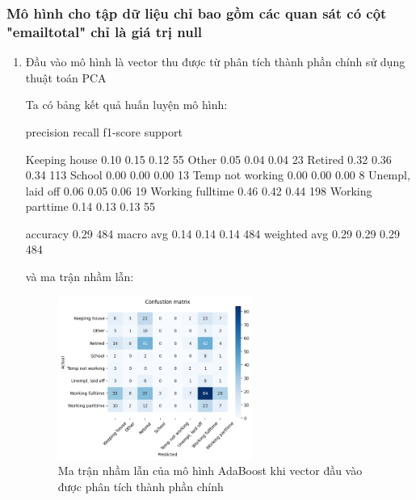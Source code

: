 \subsubsection{Mô hình cho tập dữ liệu chỉ bao gồm các quan sát có cột "emailtotal" chỉ là giá trị null}

\begin{enumerate}[label=(\alph*)]
    \item Đầu vào mô hình là vector thu được từ phân tích thành phần chính sử dụng thuật toán PCA
    
    Ta có bảng kết quả huấn luyện mô hình:

    \begin{python}
                    precision    recall  f1-score   support

   Keeping house       0.10      0.15      0.12        55
           Other       0.05      0.04      0.04        23
         Retired       0.32      0.36      0.34       113
          School       0.00      0.00      0.00        13
Temp not working       0.00      0.00      0.00         8
Unempl, laid off       0.06      0.05      0.06        19
Working fulltime       0.46      0.42      0.44       198
Working parttime       0.14      0.13      0.13        55

        accuracy                           0.29       484
       macro avg       0.14      0.14      0.14       484
    weighted avg       0.29      0.29      0.29       484
    \end{python}

    và ma trận nhầm lẫn:

    \begin{figure}[H]
        \centering
        \includegraphics[width=0.6\textwidth]{figures/Thanh/Models/AdaBoost/With_null_models_confusion_matrix_AdaBoost_PCA_features.png}
        \caption{Ma trận nhầm lẫn của mô hình AdaBoost khi vector đầu vào được phân tích thành phần chính}
        \label{fig:With_null_models_confusion_matrix_AdaBoost_PCA_features}
    \end{figure}


\end{enumerate}
